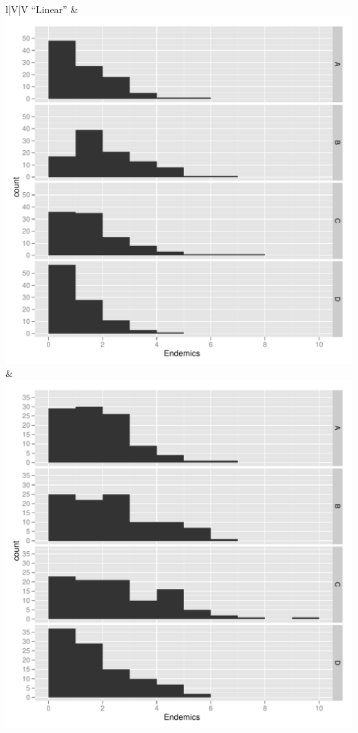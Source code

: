 \documentclass[11pt,t]{beamer}
\begin{document}
\begin{frame}
\begin{center}
\begin{tabular}{l|V|V}
\hline
``Linear''	& \includegraphics[scale=0.15]{results-endemics-linear-d0.pdf}		  & \includegraphics[scale=0.15]{results-endemics-linear-d1.pdf} 		\\
\hline	
\end{tabular}
\end{center}
\end{frame}
\end{document}
